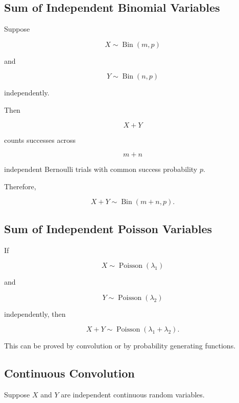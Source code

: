 \subsection{Sum of Independent Binomial Variables}
\label{subsec:sum-binomial-variables}

Suppose

\[
X\sim\operatorname{Bin}(m,p)
\]

and

\[
Y\sim\operatorname{Bin}(n,p)
\]

independently.

Then

\[
X+Y
\]

counts successes across

\[
m+n
\]

independent Bernoulli trials with common success probability \(p\).

Therefore,

\[
\boxed{
X+Y
\sim
\operatorname{Bin}(m+n,p).
}
\]

\subsection{Sum of Independent Poisson Variables}
\label{subsec:sum-poisson-functions}

If

\[
X\sim\operatorname{Poisson}(\lambda_1)
\]

and

\[
Y\sim\operatorname{Poisson}(\lambda_2)
\]

independently, then

\[
\boxed{
X+Y
\sim
\operatorname{Poisson}(\lambda_1+\lambda_2).
}
\]

This can be proved by convolution or by probability generating
functions.

\subsection{Continuous Convolution}
\label{subsec:continuous-convolution}

Suppose \(X\) and \(Y\) are independent continuous random variables.

